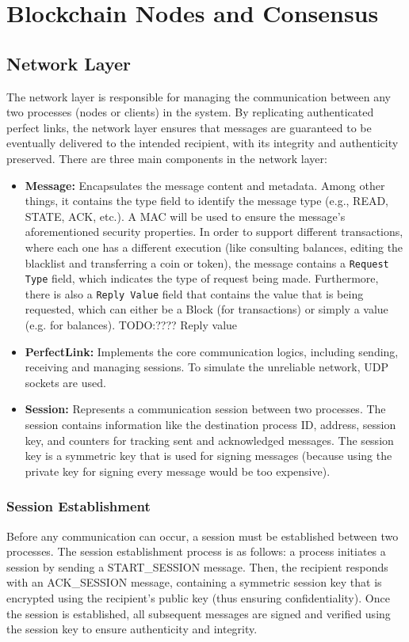 \documentclass[runningheads]{llncs}
\begin{document}
\section{Blockchain Nodes and Consensus}

\subsection{Network Layer}
The network layer is responsible for managing the communication between any two
processes (nodes or clients) in the system. By replicating authenticated perfect
links, the network layer ensures that messages are guaranteed to be eventually
delivered to the intended recipient, with its integrity and authenticity
preserved. There are three main components in the network layer:
\begin{itemize}
    \item \textbf{Message:} Encapsulates the message content and metadata. Among
    other things, it contains the type field to identify the message type (e.g.,
    READ, STATE, ACK, etc.). A MAC will be used to ensure the message's
    aforementioned security properties. In order to support different
    transactions, where each one has a different execution (like consulting
    balances, editing the blacklist and transferring a coin or token), the
    message contains a \verb|Request Type| field, which indicates the type of
    request being made. Furthermore, there is also a \verb|Reply Value| field
    that contains the value that is being requested, which can either be a Block
    (for transactions) or simply a value (e.g. for balances). TODO:???? Reply
    value 
    \item \textbf{PerfectLink:} Implements the core communication logics,
    including sending, receiving and managing sessions. To simulate the
    unreliable network, UDP sockets are used.
    \item \textbf{Session:} Represents a communication session between two
    processes. The session contains information like the destination process ID,
    address, session key, and counters for tracking sent and acknowledged
    messages. The session key is a symmetric key that is used for signing
    messages (because using the private key for signing every message would be
    too expensive).
\end{itemize}

\subsubsection{Session Establishment}
Before any communication can occur, a session must be established between two
processes. The session establishment process is as follows: a process initiates
a session by sending a START\_SESSION message. Then, the recipient responds with
an ACK\_SESSION message, containing a symmetric session key that is encrypted
using the recipient's public key (thus ensuring confidentiality). Once the
session is established, all subsequent messages are signed and verified using
the session key to ensure authenticity and integrity.
\end{document}
